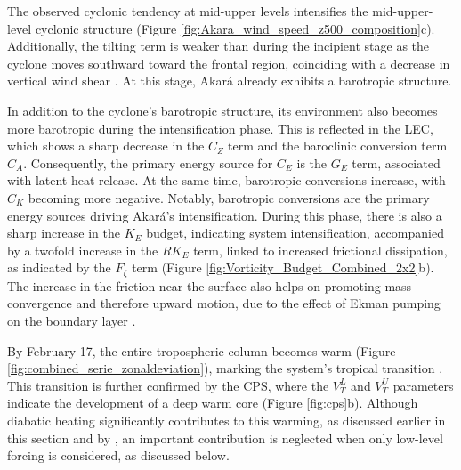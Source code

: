 \documentclass[pdflatex,sn-chicago]{sn-jnl}%
\theoremstyle{plain}
\theoremstyle{definition}
\theoremstyle{remark}
\theoremstyle{definition}
\begin{document}
The observed cyclonic tendency at mid-upper levels intensifies the mid-upper-level cyclonic structure (Figure \ref{fig:Akara_wind_speed_z500_composition}c). Additionally, the tilting term is weaker than during the incipient stage as the cyclone moves southward toward the frontal region, coinciding with a decrease in vertical wind shear \citep{reboita2024assessment}. At this stage, Akará already exhibits a barotropic structure.

In addition to the cyclone's barotropic structure, its environment also becomes more barotropic during the intensification phase. This is reflected in the LEC, which shows a sharp decrease in the $C_Z$ term and the baroclinic conversion term $C_A$. Consequently, the primary energy source for $C_E$ is the $G_E$ term, associated with latent heat release. At the same time, barotropic conversions increase, with $C_K$ becoming more negative. Notably, barotropic conversions are the primary energy sources driving Akará's intensification. During this phase, there is also a sharp increase in the $K_E$ budget, indicating system intensification, accompanied by a twofold increase in the $RK_E$ term, linked to increased frictional dissipation, as indicated by the $F_{\zeta}$ term (Figure \ref{fig:Vorticity_Budget_Combined_2x2}b). The increase in the friction near the surface also helps on promoting mass convergence and therefore upward motion, due to the effect of Ekman pumping on the boundary layer \citep[e.g.,]{hamouda2019ekman}.

By February 17, the entire tropospheric column becomes warm (Figure \ref{fig:combined_serie_zonaldeviation}), marking the system's tropical transition \citep{wood2023phase,reboita2024assessment}. This transition is further confirmed by the CPS, where the \(V_T^L\) and \(V_T^U\) parameters indicate the development of a deep warm core (Figure \ref{fig:cps}b). Although diabatic heating significantly contributes to this warming, as discussed earlier in this section and by \citet{reboita2024assessment}, an important contribution is neglected when only low-level forcing is considered, as discussed below.
\end{document}
